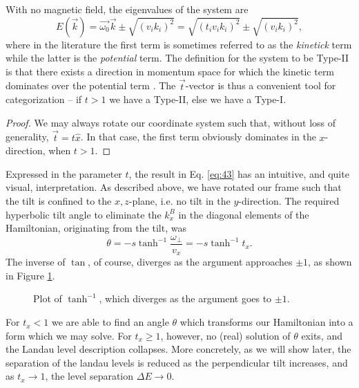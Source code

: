 With no magnetic field, the eigenvalues of the system are
\begin{equation}
  \label{eq:44}
  E(\vec{k}) = \vec{\omega_{0}} \vec{k} \pm \sqrt{(v_{i} k_{i})^{2}} = \sqrt{(t_{i} v_{i} k_{i})^{2}} \pm \sqrt{(v_{i} k_{i})^{2}},
\end{equation}
where in the literature the first term is sometimes referred to as the \emph{kinetick} term while the latter is the \emph{potential} term.
The definition for the system to be Type-II is that there exists a direction in momentum space for which the kinetic term dominates over the potential term \cite{soluyanovTypeIIWeylSemimetals2015}.
The \(\vec{t}\)-vector is thus a convenient tool for categorization -- if \(t > 1\) we have a Type-II, else we have a Type-I.
\begin{proof}
  We may always rotate our coordinate system such that, without loss of generality, \(\vec{t} = t \hat{x}\).
  In that case, the first term obviously dominates in the \(x\)-direction, when $t>1$.
\end{proof}


Expressed in the parameter \(t\), the result in Eq. \eqref{eq:43} has an intuitive, and quite visual, interpretation.
As described above, we have rotated our frame such that the tilt is confined to the \(x,z\)-plane, i.e. no tilt in the \(y\)-direction.
The required hyperbolic tilt angle to eliminate the \(k^B_{x}\) in the diagonal elements of the Hamiltonian, originating from the tilt, was
\begin{equation}
  \label{eq:45}
  \theta = - s \tanh^{-1} \frac{\omega_{\perp}}{v_{x}} = - s \tanh^{-1} t_{x}.
\end{equation}
The inverse of \(\tan \), of course, diverges as the argument approaches \(\pm 1\), as shown in Figure \ref{fig:arctanh}.
\begin{figure}[ht]
  \centering
  \caption{\label{fig:arctanh} Plot of \(\tanh^{-1}\), which diverges as the argument goes to \(\pm 1\).}
\end{figure}
For \(t_{x} < 1\) we are able to find an angle \(\theta \) which transforms our Hamiltonian into a form which we may solve.
For \(t_{x} \geq 1\), however, no (real) solution of \(\theta \) exits, and the Landau level description collapses.
More concretely, as we will show later, the separation of the landau levels is reduced as the perpendicular tilt increases, and as \( t_x \to 1 \), the level separation \( \Delta E \to 0 \).

